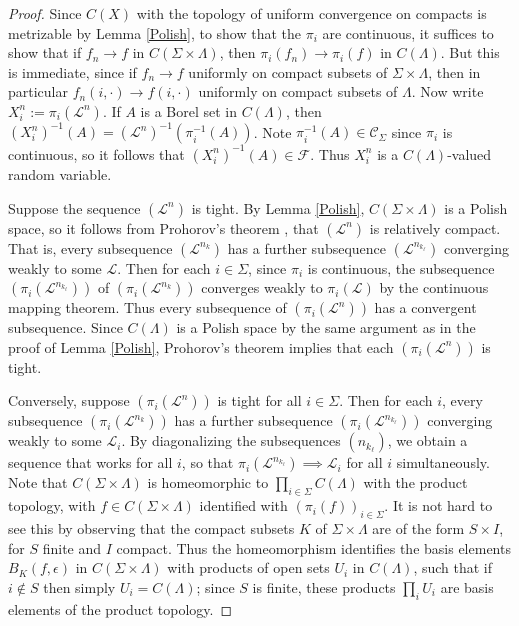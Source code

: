 \begin{proof}
	
Since $C(X)$ with the topology of uniform convergence on compacts is metrizable by Lemma \ref{Polish}, to show that the $\pi_i$ are continuous, it suffices to show that if $f_n\to f$ in $C(\Sigma\times\Lambda)$, then $\pi_i(f_n)\to \pi_i(f)$ in $C(\Lambda)$. But this is immediate, since if $f_n\to f$ uniformly on compact subsets of $\Sigma\times\Lambda$, then in particular $f_n(i,\cdot)\to f(i,\cdot)$ uniformly on compact subsets of $\Lambda$. Now write $X_i^n := \pi_i(\mathcal{L}^n)$. If $A$ is a Borel set in $C(\Lambda)$, then $(X_i^n)^{-1}(A) = (\mathcal{L}^n)^{-1}(\pi_i^{-1}(A))$. Note $\pi_i^{-1}(A)\in\mathcal{C}_\Sigma$ since $\pi_i$ is continuous, so it follows that $(X_i^n)^{-1}(A)\in\mathcal{F}$. Thus $X_i^n$ is a $C(\Lambda)$-valued random variable.

Suppose the sequence $(\mathcal{L}^n)$ is tight. By Lemma \ref{Polish}, $C(\Sigma\times\Lambda)$ is a Polish space, so it follows from Prohorov's theorem \cite[Theorem 5.1]{Billing}, that $(\mathcal{L}^n)$ is relatively compact. That is, every subsequence $(\mathcal{L}^{n_k})$ has a further subsequence $(\mathcal{L}^{n_{k_\ell}})$ converging weakly to some $\mathcal{L}$. Then for each $i\in\Sigma$, since $\pi_i$ is continuous, the subsequence $(\pi_i(\mathcal{L}^{n_{k_\ell}}))$ of $(\pi_i(\mathcal{L}^{n_k}))$ converges weakly to $\pi_i(\mathcal{L})$ by the continuous mapping theorem. Thus every subsequence of $(\pi_i(\mathcal{L}^n))$ has a convergent subsequence. Since $C(\Lambda)$ is a Polish space by the same argument as in the proof of Lemma \ref{Polish}, Prohorov's theorem implies that each $(\pi_i(\mathcal{L}^n))$ is tight.

Conversely, suppose $(\pi_i(\mathcal{L}^n))$ is tight for all $i\in\Sigma$. Then for each $i$, every subsequence $(\pi_i(\mathcal{L}^{n_k}))$ has a further subsequence $(\pi_i(\mathcal{L}^{n_{k_\ell}}))$ converging weakly to some $\mathcal{L}_i$. By diagonalizing the subsequences $(n_{k_\ell})$, we obtain a sequence that works for all $i$, so that $\pi_i(\mathcal{L}^{n_{k_\ell}})\implies \mathcal{L}_i$ for all $i$ simultaneously. Note that $C(\Sigma\times\Lambda)$ is homeomorphic to $\prod_{i\in\Sigma} C(\Lambda)$ with the product topology, with $f\in C(\Sigma\times\Lambda)$ identified with $(\pi_i(f))_{i\in\Sigma}$. It is not hard to see this by observing that the compact subsets $K$ of $\Sigma\times\Lambda$ are of the form $S\times I$, for $S$ finite and $I$ compact. Thus the homeomorphism identifies the basis elements $B_K(f,\epsilon)$ in $C(\Sigma\times\Lambda)$ with products of open sets $U_i$ in $C(\Lambda)$, such that if $i\notin S$ then simply $U_i = C(\Lambda)$; since $S$ is finite, these products $\prod_i U_i$ are basis elements of the product topology.


\end{proof}

